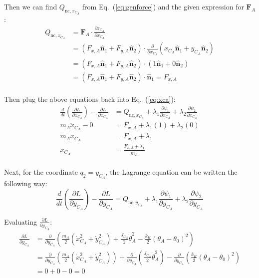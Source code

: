 \documentclass[titlepage]{article}
\begin{document}
Then we can find $Q_{\text{nc},x_{C_A}}$ from Eq.~(\ref{eq:genforce}) and the given expression for $\boldsymbol{F}_A$:
\begin{equation}
	\begin{split}
		Q_{\text{nc},x_{C_A}}&=\boldsymbol{F}_A\cdot\frac{\partial \boldsymbol{r}_{C_A}}{\partial x_{C_A}} \\
		&=\left(F_{x,A}\hat{\boldsymbol{n}}_1+F_{y,A}\hat{\boldsymbol{n}}_2\right)\cdot\frac{\partial}{\partial x_{C_A}}\left(x_{C_A}\hat{\boldsymbol{n}}_1+y_{C_A}\hat{\boldsymbol{n}}_2\right) \\
		&=\left(F_{x,A}\hat{\boldsymbol{n}}_1+F_{y,A}\hat{\boldsymbol{n}}_2\right)\cdot\left(1\hat{\boldsymbol{n}}_1+0\hat{\boldsymbol{n}}_2\right) \\
		&=\left(F_{x,A}\hat{\boldsymbol{n}}_1+F_{y,A}\hat{\boldsymbol{n}}_2\right)\cdot\hat{\boldsymbol{n}}_1=F_{x,A} \\
	\end{split}
\end{equation}

Then plug the above equations back into Eq.~(\ref{eq:xca}):
\begin{equation}
	\begin{split}
		\frac{d}{dt}\left(\frac{\partial L}{\partial\dot{x}_{C_A}}\right)-\frac{\partial L}{\partial x_{C_A}}&=Q_{\text{nc},x_{C_A}}+\lambda_1\frac{\partial\psi_1}{\partial x_{C_A}}+\lambda_2\frac{\partial\psi_2}{\partial x_{C_A}} \\
		m_A\ddot{x}_{C_A}-0&=F_{x,A}+\lambda_1(1)+\lambda_2(0) \\
		m_A\ddot{x}_{C_A}&=F_{x,A}+\lambda_1 \\
		\ddot{x}_{C_A}&=\frac{F_{x,A}+\lambda_1}{m_A} \\
	\end{split}
\end{equation}

Next, for the coordinate $q_2=y_{C_A}$, the Lagrange equation can be written the following way:
\begin{equation}
	\frac{d}{dt}\left(\frac{\partial L}{\partial\dot{y}_{C_A}}\right)-\frac{\partial L}{\partial y_{C_A}}=Q_{\text{nc},y_{C_A}}+\lambda_1\frac{\partial\psi_1}{\partial y_{C_A}}+\lambda_2\frac{\partial\psi_2}{\partial y_{C_A}}
	\label{eq:yca}
\end{equation}

Evaluating $\frac{\partial L}{\partial y_{C_A}}$:
\begin{equation}
	\begin{split}
		\frac{\partial L}{\partial y_{C_A}}&=\frac{\partial}{\partial y_{C_A}}\left(\frac{m_A}{2}\left(\dot{x}_{C_A}^2+\dot{y}_{C_A}^2\right)+\frac{J_{C_A}}{2}\dot{\theta}_A^2-\frac{k_H}{2}(\theta_A-\theta_0)^2\right) \\
		&=\frac{\partial}{\partial y_{C_A}}\left(\frac{m_A}{2}\left(\dot{x}_{C_A}^2+\dot{y}_{C_A}^2\right)\right)+\frac{\partial}{\partial y_{C_A}}\left(\frac{J_{C_A}}{2}\dot{\theta}_A^2\right)-\frac{\partial}{\partial y_{C_A}}\left(\frac{k_H}{2}(\theta_A-\theta_0)^2\right) \\
		&=0+0-0=0 \\
	\end{split}
\end{equation}
\end{document}

